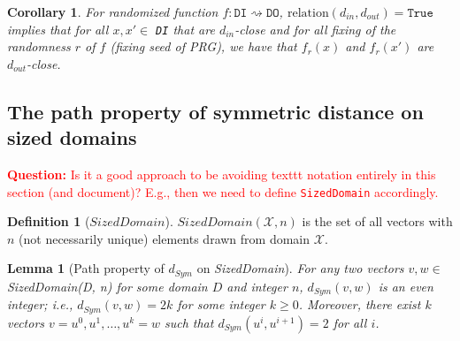 \documentclass[11pt,a4paper]{article}
\newtheorem{corollary}[theorem]{Corollary}
\newtheorem{lemma}[theorem]{Lemma}
\theoremstyle{definition}
\newtheorem{definition}[theorem]{Definition}
\newcommand{\Relation}{\mathrm{relation}}
\newcommand{\questionc}[1]{\textcolor{red}{\textbf{Question:} #1}}
\begin{document}
\begin{corollary}
For randomized function $f: \texttt{DI} \rightsquigarrow \texttt{DO}$, $\Relation(d_{in}, d_{out}) = \texttt{True}$ implies that for all $x, x' \in$ \texttt{DI} that are $d_{in}$-close and for all fixing of the randomness $r$ of $f$ (fixing seed of PRG), we have that $f_r(x)$ and $f_r(x')$ are $d_{out}$-close.
\end{corollary}

\subsection{The path property of symmetric distance on sized domains}\label{sec:pathsized}

\questionc{Is it a good approach to be avoiding texttt notation entirely in this section (and document)? E.g., then we need to define \texttt{SizedDomain} accordingly.}

\begin{definition}[$SizedDomain$]
    $SizedDomain(\mathcal{X},n)$ is the set of all vectors with $n$ (not necessarily unique) elements drawn from domain $\mathcal{X}$.
\end{definition}

\begin{lemma}[Path property of $d_{Sym}$ on \textit{SizedDomain}]\label{lemma:path1}
    For any two vectors $v, w \in$ \textit{SizedDomain(D, n)} for some domain $D$ and integer $n$, $d_{Sym}(v,w)$ is an even integer; i.e., $d_{Sym}(v,w) = 2k$ for some integer $k \geq 0$. Moreover, there exist $k$ vectors $v=u^0, u^1, \ldots, u^k=w$ such that $d_{Sym}(u^i,u^{i+1})=2$ for all $i$.
\end{lemma}
\end{document}
